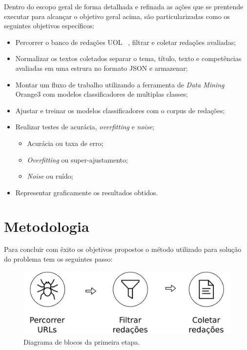 Dentro do escopo geral de forma detalhada e refinada as ações que se prentende executar para alcançar o objetivo geral acima, são particularizadas como os seguintes objetivos específicos:

\begin{itemize}
 \item Percorrer o banco de redações UOL ~\cite{uol_banco_redacoes:2017}, filtrar e coletar redações avaliadas;
 \item Normalizar os textos coletados separar o tema, título, texto e competências avaliadas em uma estrura no formato JSON e armazenar;
 \item Montar um fluxo de trabalho utilizando a ferramenta de \textit{Data Mining} Orange3 com modelos  classificadores de multiplas classes;
 \item Ajustar e treinar os modelos classificadores com o corpus de redações; 
 \item Realizar testes de acurácia, \textit{overfitting} e \textit{noise};
  \begin{itemize}
   \item Acurácia ou taxa de erro;
   \item \textit{Overfitting} ou super-ajustamento;
   \item \textit{Noise} ou ruído;
  \end{itemize}
 \item Representar graficamente os resultados obtidos. 
\end{itemize}

\section{Metodologia}

Para concluir com êxito os objetivos propostos o método utilizado para solução do problema tem os seguintes passo:

\begin{figure}[h]
\begin{center}
    \includegraphics[scale=0.75]{figuras/metodologia_1.png}
\end{center}
\caption{Diagrama de blocos da primeira etapa.}
\label{Img:3DRobotWorkspace}
\end{figure}

